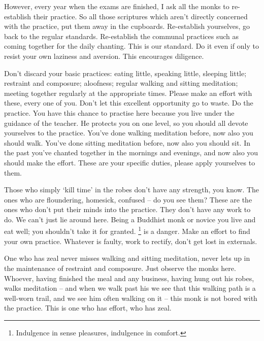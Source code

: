 However, every year when the exams are finished, I ask all the monks to re-establish their practice. So all those scriptures which aren't directly concerned with the practice, put them away in the cupboards. Re-establish yourselves, go back to the regular standards. Re-establish the communal practices such as coming together for the daily chanting. This is our standard. Do it even if only to resist your own laziness and aversion. This encourages diligence. 

Don't discard your basic practices: eating little, speaking little, sleeping little; restraint and composure; aloofness; regular walking and sitting meditation; meeting together regularly at the appropriate times. Please make an effort with these, every one of you. Don't let this excellent opportunity go to waste. Do the practice. You have this chance to practise here because you live under the guidance of the teacher. He protects you on one level, so you should all devote yourselves to the practice. You've done walking meditation before, now also you should walk. You've done sitting meditation before, now also you should sit. In the past you've chanted together in the mornings and evenings, and now also you should make the effort. These are your specific duties, please apply yourselves to them. 

Those who simply `kill time' in the robes don't have any strength, you know. The ones who are floundering, homesick, confused -- do you see them? These are the ones who don't put their minds into the practice. They don't have any work to do. We can't just lie around here. Being a Buddhist monk or novice you live and eat well; you shouldn't take it for granted. \footnote{Indulgence in sense pleasures, indulgence in comfort.} is a danger. Make an effort to find your own practice. Whatever is faulty, work to rectify, don't get lost in externals. 

One who has zeal never misses walking and sitting meditation, never lets up in the maintenance of restraint and composure. Just observe the monks here. Whoever, having finished the meal and any business, having hung out his robes, walks meditation -- and when we walk past his  we see that this walking path is a well-worn trail, and we see him often walking on it -- this monk is not bored with the practice. This is one who has effort, who has zeal. 

